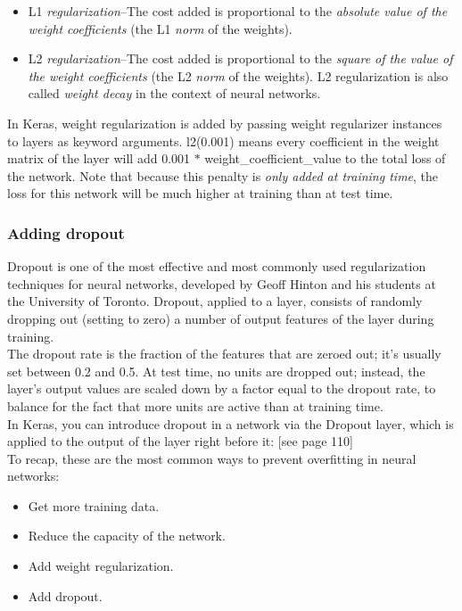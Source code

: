 \documentclass{article}
\numberwithin{equation}{section} %
\begin{document}
\begin{itemize}
	\item L1 \textit{regularization}--The cost added is proportional to the \textit{absolute value of the weight coefficients} (the L1 \textit{norm} of the weights).
	\item L2 \textit{regularization}--The cost added is proportional to the \textit{square of the value of the weight coefficients} (the L2 \textit{norm} of the weights). L2 regularization is also called \textit{weight decay} in the context of neural networks.
\end{itemize}

In Keras, weight regularization is added by passing weight regularizer instances to layers as keyword arguments. l2(0.001) means every coefficient in the weight matrix of the layer will add 0.001 $\ast$ weight\_coefficient\_value to the total loss of the network. Note that because this penalty is \textit{only added at training time}, the loss for this network will be much higher at training than at test time. \\

\subsubsection{Adding dropout}

Dropout is one of the most effective and most commonly used regularization techniques for neural networks, developed by Geoff Hinton and his students at the University of Toronto. Dropout, applied to a layer, consists of randomly dropping out (setting to zero) a number of output features of the layer during training. \\

The dropout rate is the fraction of the features that are zeroed out; it’s usually set between 0.2 and 0.5. At test time, no units are dropped out; instead, the layer’s output values are scaled down by a factor equal to the dropout rate, to balance for the fact that more units are active than at training time. \\

In Keras, you can introduce dropout in a network via the Dropout layer, which is
applied to the output of the layer right before it: [see page 110] \\

To recap, these are the most common ways to prevent overfitting in neural networks:

\begin{itemize}
	\item Get more training data.
	\item Reduce the capacity of the network.
	\item Add weight regularization.
	\item Add dropout.
\end{itemize}
\end{document}
